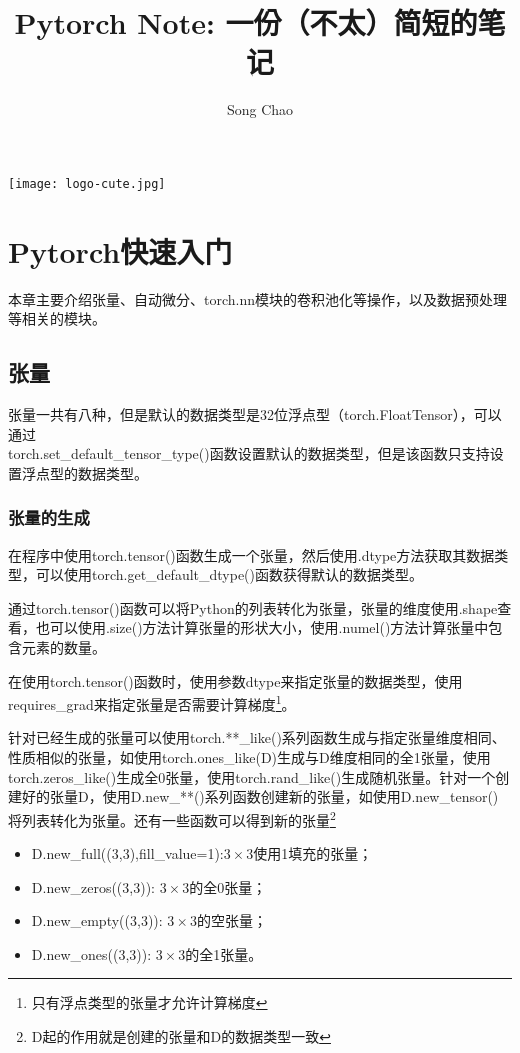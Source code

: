 \documentclass[cn,hazy,blue,14pt,screen]{elegantnote}
\title{Pytorch Note: 一份（不太）简短的笔记}
\author{Song Chao}
\date{\zhtoday}
\begin{document}
\maketitle

\centerline{
  \texttt{[image: logo-cute.jpg]}
}

\section{Pytorch快速入门}

本章主要介绍张量、自动微分、torch.nn模块的卷积池化等操作，以及数据预处理等相关的模块。

\subsection{张量}

张量一共有八种，但是默认的数据类型是32位浮点型（torch.FloatTensor），可以通过\\torch.set\_default\_tensor\_type()函数设置默认的数据类型，但是该函数只支持设置浮点型的数据类型。

\subsubsection{张量的生成}

在程序中使用torch.tensor()函数生成一个张量，然后使用.dtype方法获取其数据类型，可以使用torch.get\_default\_dtype()函数获得默认的数据类型。

通过torch.tensor()函数可以将Python的列表转化为张量，张量的维度使用.shape查看，也可以使用.size()方法计算张量的形状大小，使用.numel()方法计算张量中包含元素的数量。

在使用torch.tensor()函数时，使用参数dtype来指定张量的数据类型，使用requires\_grad来指定张量是否需要计算梯度\footnote{只有浮点类型的张量才允许计算梯度}。

针对已经生成的张量可以使用torch.**\_like()系列函数生成与指定张量维度相同、性质相似的张量，如使用torch.ones\_like(D)生成与D维度相同的全1张量，使用torch.zeros\_like()生成全0张量，使用torch.rand\_like()生成随机张量。针对一个创建好的张量D，使用D.new\_**()系列函数创建新的张量，如使用D.new\_tensor()将列表转化为张量。还有一些函数可以得到新的张量\footnote{D起的作用就是创建的张量和D的数据类型一致}
\begin{itemize}
  \item D.new\_full((3,3),fill\_value=1):$3\times 3$使用1填充的张量；
  \item D.new\_zeros((3,3)): $3\times 3$的全0张量；
  \item D.new\_empty((3,3)): $3\times 3$的空张量；
  \item D.new\_ones((3,3)): $3\times 3$的全1张量。
\end{itemize}
\end{document}
